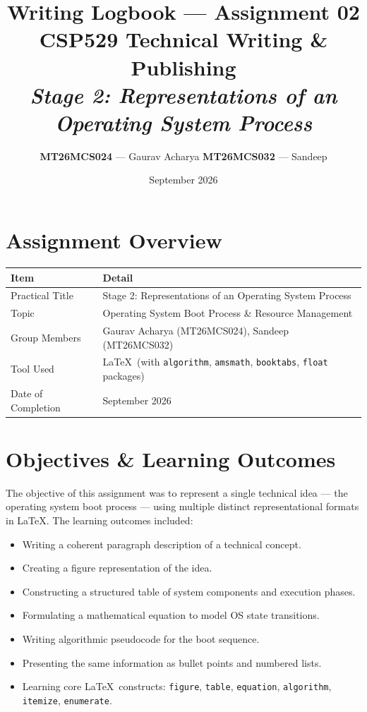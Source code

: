 \documentclass[11pt, a4paper]{article}
\title{
    \vspace{-1cm}
    \textbf{Writing Logbook --- Assignment 02} \\[0.3em]
    \large CSP529 Technical Writing \& Publishing \\[0.2em]
    \large \textit{Stage 2: Representations of an Operating System Process}
}
\author{
    \textbf{MT26MCS024} --- Gaurav Acharya \quad
    \textbf{MT26MCS032} --- Sandeep
}
\date{September 2026}
\begin{document}
\maketitle
\thispagestyle{fancy}

\section{Assignment Overview}

\begin{tabular}{@{}p{4.5cm} p{10cm}@{}}
    \toprule
    \textbf{Item} & \textbf{Detail} \\
    \midrule
    Practical Title & Stage 2: Representations of an Operating System Process \\
    Topic & Operating System Boot Process \& Resource Management \\
    Group Members & Gaurav Acharya (MT26MCS024), Sandeep (MT26MCS032) \\
    Tool Used & \LaTeX\ (with \texttt{algorithm}, \texttt{amsmath}, \texttt{booktabs}, \texttt{float} packages) \\
    Date of Completion & September 2026 \\
    \bottomrule
\end{tabular}

\section{Objectives \& Learning Outcomes}

The objective of this assignment was to represent a single technical idea --- the operating system boot process --- using multiple distinct representational formats in \LaTeX. The learning outcomes included:

\begin{itemize}[nosep]
    \item Writing a coherent paragraph description of a technical concept.
    \item Creating a figure representation of the idea.
    \item Constructing a structured table of system components and execution phases.
    \item Formulating a mathematical equation to model OS state transitions.
    \item Writing algorithmic pseudocode for the boot sequence.
    \item Presenting the same information as bullet points and numbered lists.
    \item Learning core \LaTeX\ constructs: \texttt{figure}, \texttt{table}, \texttt{equation}, \texttt{algorithm}, \texttt{itemize}, \texttt{enumerate}.
\end{itemize}
\end{document}
